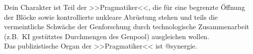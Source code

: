 Dein Charakter ist Teil der >>Pragmatiker<<, die für eine begrenzte Öffnung der
Blöcke sowie kontrollierte nukleare Abrüstung stehen und teils die vermeintliche
Schwäche der Genforschung durch technologische Zusammenarbeit (z.B.~KI
gestütztes Durchmengen des Genpool) ausgleichen wollen.\\ 
Das publizistische Organ der >>Pragmatiker<< ist @synergie.
